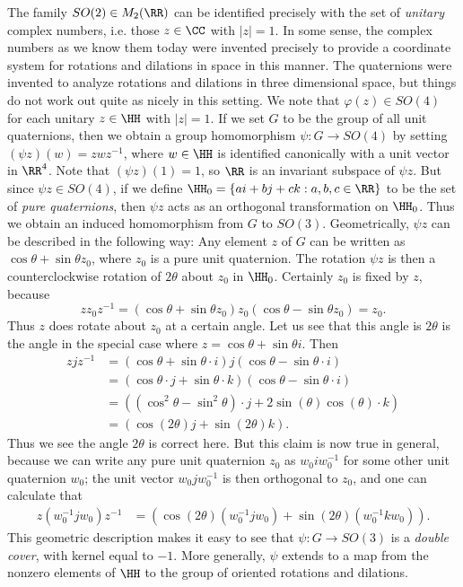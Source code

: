 \begin{example}
    The family $SO(2) \in M_2(\RR)$ can be identified precisely with the set of \emph{unitary} complex numbers, i.e. those $z \in \CC$ with $|z| = 1$. In some sense, the complex numbers as we know them today were invented precisely to provide a coordinate system for rotations and dilations in space in this manner. The quaternions were invented to analyze rotations and dilations in three dimensional space, but things do not work out quite as nicely in this setting. We note that $\varphi(z) \in SO(4)$ for each unitary $z \in \HH$ with $|z| = 1$. If we set $G$ to be the group of all unit quaternions, then we obtain a group homomorphism $\psi: G \to SO(4)$ by setting $(\psi z)(w) = zwz^{-1}$, where $w \in \HH$ is identified canonically with a unit vector in $\RR^4$. Note that $(\psi z)(1) = 1$, so $\RR$ is an invariant subspace of $\psi z$. But since $\psi z \in SO(4)$, if we define $\HH_0 = \{ ai + bj + ck : a,b,c \in \RR \}$ to be the set of \emph{pure quaternions}, then $\psi z$ acts as an orthogonal transformation on $\HH_0$. Thus we obtain an induced homomorphism from $G$ to $SO(3)$. Geometrically, $\psi z$ can be described in the following way: Any element $z$ of $G$ can be written as $\cos \theta + \sin \theta z_0$, where $z_0$ is a pure unit quaternion. The rotation $\psi z$ is then a counterclockwise rotation of $2 \theta$ about $z_0$ in $\HH_0$. Certainly $z_0$ is fixed by $z$, because
    \[ zz_0z^{-1} = (\cos \theta + \sin \theta z_0) z_0 (\cos \theta - \sin \theta z_0) = z_0. \]
    Thus $z$ does rotate about $z_0$ at a certain angle. Let us see that this angle is $2\theta$ is the angle in the special case where $z = \cos \theta + \sin \theta i$. Then
    \begin{align*}
        zjz^{-1} &= (\cos \theta + \sin \theta \cdot i)j(\cos \theta - \sin \theta \cdot i)\\
        &= (\cos \theta \cdot j + \sin \theta \cdot k)(\cos \theta - \sin \theta \cdot i)\\
        &= ((\cos^2 \theta - \sin^2 \theta) \cdot j + 2 \sin(\theta) \cos(\theta) \cdot k)\\
        &= (\cos(2 \theta) j + \sin(2 \theta) k).
    \end{align*}
    Thus we see the angle $2 \theta$ is correct here. But this claim is now true in general, because we can write any pure unit quaternion $z_0$ as $w_0 i w_0^{-1}$ for some other unit quaternion $w_0$; the unit vector $w_0 j w_0^{-1}$ is then orthogonal to $z_0$, and one can calculate that
    \begin{align*}
        z(w_0^{-1} j w_0)z^{-1} &= (\cos(2 \theta) (w_0^{-1} j w_0) + \sin(2 \theta) (w_0^{-1} k w_0)).
    \end{align*}
    This geometric description makes it easy to see that $\psi: G \to SO(3)$ is a \emph{double cover}, with kernel equal to $-1$. More generally, $\psi$ extends to a map from the nonzero elements of $\HH$ to the group of oriented rotations and dilations.
\end{example}

